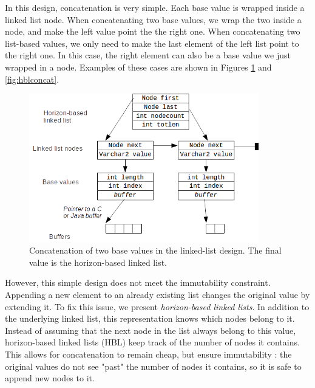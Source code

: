 \documentclass[twoside,11pt,a4paper]{article}
\newcommand{\pls}[1]{\small\texttt{#1}\normalsize}
\newcommand{\plstype}[1]{\pls{#1}}
\newcommand{\varchar}{\plstype{VARCHAR2}}
\begin{document}
In this design, concatenation is very simple. Each base value is wrapped inside a linked list node. When concatenating two base values, we wrap the two inside a node, and make the left value point the the right one. When concatenating two list-based values, we only need to make the last element of the left list point to the right one. In this case, the right element can also be a base value we just wrapped in a node. Examples of these cases are shown in Figures \ref{fig:baseconcat} and \ref{fig:hblconcat}.

\begin{figure}[bt]
	\centering
	\includegraphics[width=10cm]{./graphs/ConcatBase.png}
	\caption[Concatenation of two base values in the linked-list design]{Concatenation of two base values in the linked-list design. The final value is the horizon-based linked list.}
	\label{fig:baseconcat}
\end{figure}

However, this simple design does not meet the immutability constraint. Appending a new element to an already existing list changes the original value by extending it. To fix this issue, we present \textit{horizon-based linked lists}. In addition to the underlying linked list, this representation knows which nodes belong to it. Instead of assuming that the next node in the list always belong to this value, horizon-based linked lists (HBL) keep track of the number of nodes it contains. This allows for concatenation to remain cheap, but ensure immutability : the original values do not see "past" the number of nodes it contains, so it is safe to append new nodes to it.


\end{document}
